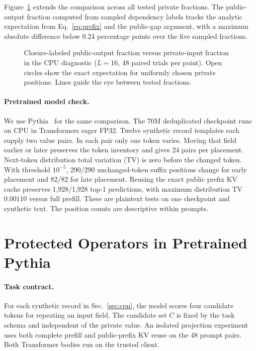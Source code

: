 \documentclass[runningheads]{llncs}
\begin{document}
Figure~\ref{fig:causal-sweep} extends the comparison across all tested
private fractions. The public-output fraction computed from sampled dependency labels tracks the analytic expectation from Eq.~\eqref{eq:prefix} and the public-gap
argument, with a maximum absolute difference below 0.24 percentage points
over the five sampled fractions.

\begin{figure}[tb]
\centering

\caption{Closure-labeled public-output fraction versus private-input fraction in the CPU
diagnostic ($L=16$, 48 paired trials per point). Open circles show the exact
expectation for uniformly chosen private positions. Lines guide the eye
between tested fractions.}
\label{fig:causal-sweep}
\end{figure}

\paragraph{Pretrained model check.}
We use Pythia~\cite{pythia} for the same comparison. The 70M deduplicated
checkpoint runs on CPU in Transformers eager FP32. Twelve synthetic record templates each
supply two value pairs. In each pair only one token varies. Moving that field
earlier or later preserves the token inventory and gives 24 pairs per
placement. Next-token distribution total variation (TV) is zero before the
changed token. With threshold $10^{-5}$, 290/290 unchanged-token suffix
positions change for early placement and 82/82 for late placement.
Reusing the exact public prefix KV cache preserves 1,928/1,928 top-1
predictions, with maximum distribution TV $0.00110$ versus full prefill.
These are plaintext tests on one checkpoint and synthetic text. The
position counts are descriptive within prompts.

\section{Protected Operators in Pretrained Pythia}
\label{sec:protected-pythia}
\paragraph{Task contract.}
For each synthetic record in Sec.~\ref{sec:cpu}, the model scores
four candidate tokens for repeating an input field. The candidate set $C$
is fixed by the task schema and independent of the private value.
An isolated projection experiment uses both complete prefill and
public-prefix KV reuse on the 48 prompt pairs. Both Transformer bodies
run on the trusted client.
\end{document}

